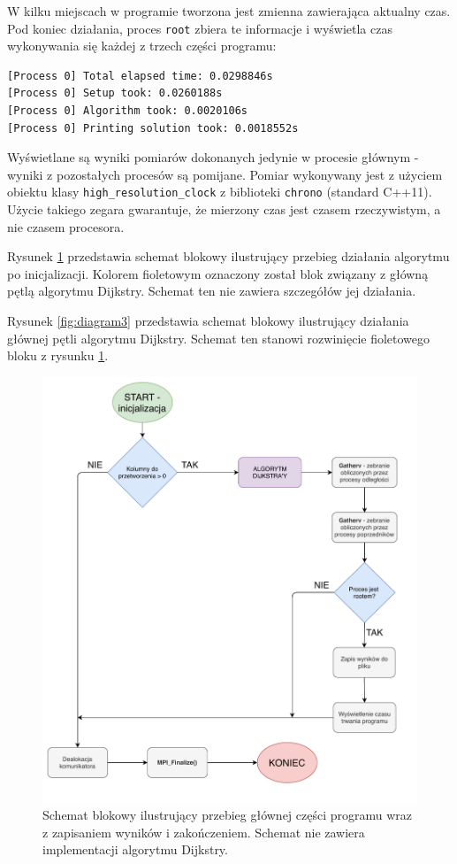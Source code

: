 \documentclass[12pt]{article}
\begin{document}
\vspace{5mm}
W kilku miejscach w programie tworzona jest zmienna zawierająca aktualny czas. Pod koniec działania, proces \lstinline{root} zbiera te informacje i wyświetla czas wykonywania się każdej z trzech części programu:
\begin{lstlisting}
[Process 0] Total elapsed time: 0.0298846s
[Process 0] Setup took: 0.0260188s
[Process 0] Algorithm took: 0.0020106s
[Process 0] Printing solution took: 0.0018552s
\end{lstlisting}
Wyświetlane są wyniki pomiarów dokonanych jedynie w procesie głównym - wyniki z pozostałych procesów są pomijane. Pomiar wykonywany jest z użyciem obiektu klasy \lstinline{high_resolution_clock} z biblioteki \lstinline{chrono} (standard C++11). Użycie takiego zegara gwarantuje, że mierzony czas jest czasem rzeczywistym, a nie czasem procesora.

\vspace{5mm}
Rysunek \ref{fig:diagram2} przedstawia schemat blokowy ilustrujący przebieg działania algorytmu po inicjalizacji. Kolorem fioletowym oznaczony został blok związany z główną pętlą algorytmu Dijkstry. Schemat ten nie zawiera szczegółów jej działania.

\vspace{5mm}
Rysunek \ref{fig:diagram3} przedstawia schemat blokowy ilustrujący działania głównej pętli algorytmu Dijkstry. Schemat ten stanowi rozwinięcie fioletowego bloku z rysunku \ref{fig:diagram2}.

\begin{figure}[H]
\centering
\includegraphics[width=\textwidth]{static/Diagram2.pdf}
\caption{Schemat blokowy ilustrujący przebieg głównej części programu wraz z zapisaniem wyników i zakończeniem. Schemat nie zawiera implementacji algorytmu Dijkstry.}
\label{fig:diagram2}
\end{figure}
\end{document}
